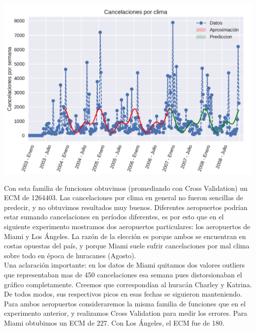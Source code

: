 {\centering
    \includegraphics[scale=0.8]{informe/imagenes/cancelacionesPorClimaGeneralPrediccionV1.pdf} \\
}

Con esta familia de funciones obtuvimos (promediando con Cross Validation) un ECM de 1264403. Las cancelaciones por clima en general no fueron sencillas de predecir, y no obtuvimos resultados muy buenos. Diferentes aeropuertos podrían estar sumando cancelaciones en períodos diferentes, es por esto que en el siguiente experimento mostramos dos aeropuertos particulares: los aeropuertos de Miami y Los Ángeles. La razón de la elección es porque ambos se encuentran en costas opuestas del país, y porque Miami suele sufrir cancelaciones por mal clima sobre todo en época de huracanes (Agosto). \\

Una aclaración importante: en los datos de Miami quitamos dos valores outliers que representaban mas de 450 cancelaciones esa semana pues distorsionaban el gráfico completamente. Creemos que correspondían al huracán Charley y Katrina. De todos modos, sus respectivos picos en esas fechas se siguieron manteniendo. \\

Para ambos aeropuertos consideraremos la misma familia de funciones que en el experimento anterior, y realizamos Cross Validation para medir los errores. Para Miami obtubimos un ECM de 227. Con Los Ángeles, el ECM fue de 180.

